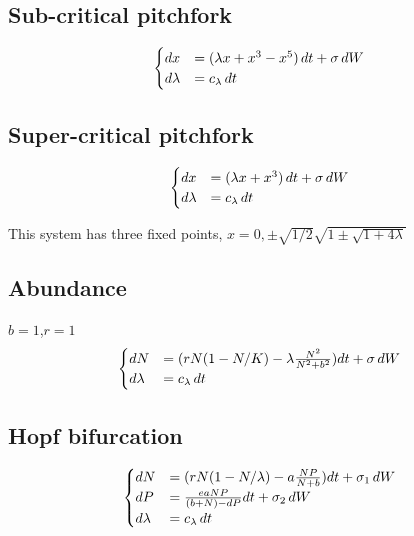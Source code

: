 \subsection{Sub-critical pitchfork}



\begin{equation}
	\begin{cases}
	dx&=(\lambda x+x^3-x^5) \, dt +\sigma \, dW\\
		d\lambda&=c_\lambda \, dt
	\end{cases}
	\label{eq:ASSsubcri_pitch}
\end{equation}



\subsection{Super-critical pitchfork}

\begin{equation}
	\begin{cases}
		dx&=(\lambda x+x^3) \, dt +\sigma \, dW\\
		d\lambda&=c_\lambda \, dt
	\end{cases}
	\label{eq:ASSsupercri_pitch}
\end{equation}

This system has three fixed points, $x={0,\pm \sqrt{1/2}\sqrt{1\pm\sqrt{1+4\lambda }}}$



\subsection{Abundance}
	$b=1$,$r=1$
\begin{equation}
	\begin{cases}
		dN&=(rN(1-N/K)-\lambda \frac{N^2}{N^2+b^2}) dt +\sigma \, dW\\
		d\lambda&=c_\lambda \, dt
	\end{cases}
	\label{eq:ASSabun}
\end{equation}

\subsection{Hopf  bifurcation}

\begin{equation}
	\begin{cases}
		dN&=(rN(1-N/\lambda)-a \frac{N P}{N+b}) dt +\sigma_1  \, dW\\
		dP&=\frac{eaNP}{(b+N)-dP} dt +\sigma_2  \, dW\\
		d\lambda&=c_\lambda \, dt
	\end{cases}
	\label{eq:ASSabun_hopf}
\end{equation}



